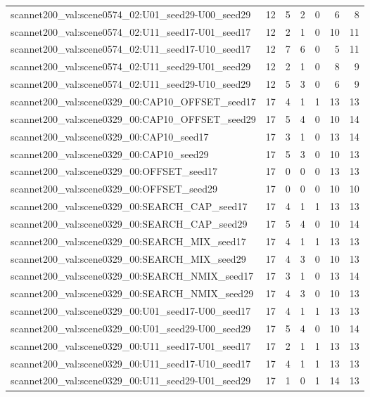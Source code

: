 \begin{table}[t]
\begin{tabular}{lrrrrrr}
scannet200\_val:scene0574\_02:U01\_seed29-U00\_seed29 & 12 & 5 & 2 & 0 & 6 & 8 \\
scannet200\_val:scene0574\_02:U11\_seed17-U01\_seed17 & 12 & 2 & 1 & 0 & 10 & 11 \\
scannet200\_val:scene0574\_02:U11\_seed17-U10\_seed17 & 12 & 7 & 6 & 0 & 5 & 11 \\
scannet200\_val:scene0574\_02:U11\_seed29-U01\_seed29 & 12 & 2 & 1 & 0 & 8 & 9 \\
scannet200\_val:scene0574\_02:U11\_seed29-U10\_seed29 & 12 & 5 & 3 & 0 & 6 & 9 \\
scannet200\_val:scene0329\_00:CAP10\_OFFSET\_seed17 & 17 & 4 & 1 & 1 & 13 & 13 \\
scannet200\_val:scene0329\_00:CAP10\_OFFSET\_seed29 & 17 & 5 & 4 & 0 & 10 & 14 \\
scannet200\_val:scene0329\_00:CAP10\_seed17 & 17 & 3 & 1 & 0 & 13 & 14 \\
scannet200\_val:scene0329\_00:CAP10\_seed29 & 17 & 5 & 3 & 0 & 10 & 13 \\
scannet200\_val:scene0329\_00:OFFSET\_seed17 & 17 & 0 & 0 & 0 & 13 & 13 \\
scannet200\_val:scene0329\_00:OFFSET\_seed29 & 17 & 0 & 0 & 0 & 10 & 10 \\
scannet200\_val:scene0329\_00:SEARCH\_CAP\_seed17 & 17 & 4 & 1 & 1 & 13 & 13 \\
scannet200\_val:scene0329\_00:SEARCH\_CAP\_seed29 & 17 & 5 & 4 & 0 & 10 & 14 \\
scannet200\_val:scene0329\_00:SEARCH\_MIX\_seed17 & 17 & 4 & 1 & 1 & 13 & 13 \\
scannet200\_val:scene0329\_00:SEARCH\_MIX\_seed29 & 17 & 4 & 3 & 0 & 10 & 13 \\
scannet200\_val:scene0329\_00:SEARCH\_NMIX\_seed17 & 17 & 3 & 1 & 0 & 13 & 14 \\
scannet200\_val:scene0329\_00:SEARCH\_NMIX\_seed29 & 17 & 4 & 3 & 0 & 10 & 13 \\
scannet200\_val:scene0329\_00:U01\_seed17-U00\_seed17 & 17 & 4 & 1 & 1 & 13 & 13 \\
scannet200\_val:scene0329\_00:U01\_seed29-U00\_seed29 & 17 & 5 & 4 & 0 & 10 & 14 \\
scannet200\_val:scene0329\_00:U11\_seed17-U01\_seed17 & 17 & 2 & 1 & 1 & 13 & 13 \\
scannet200\_val:scene0329\_00:U11\_seed17-U10\_seed17 & 17 & 4 & 1 & 1 & 13 & 13 \\
scannet200\_val:scene0329\_00:U11\_seed29-U01\_seed29 & 17 & 1 & 0 & 1 & 14 & 13 \\

\end{tabular}
\end{table}
